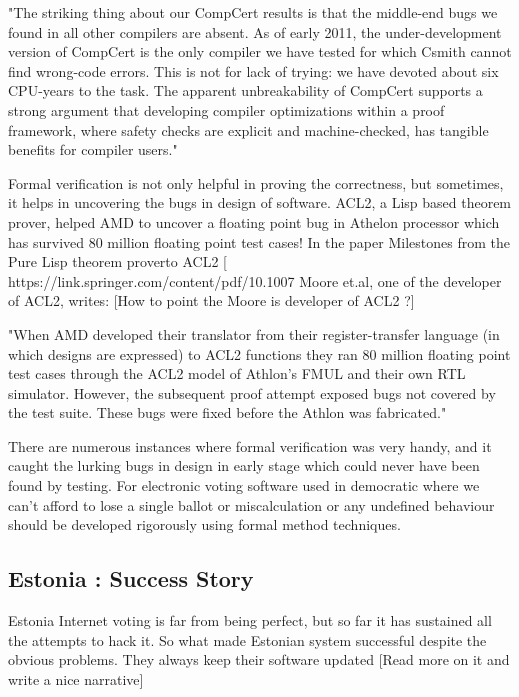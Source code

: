 	"The striking thing about our CompCert results is that the middle-end 
	bugs we found in all other compilers are absent. As of early 2011,
	the under-development version of CompCert is the only compiler we
	have tested for which Csmith cannot find wrong-code errors. This is
	not for lack of trying: we have devoted about six CPU-years to the
	task. The apparent unbreakability of CompCert supports a strong
	argument that developing compiler optimizations within a proof
	framework, where safety checks are explicit and machine-checked,
	has tangible benefits for compiler users."
	
	Formal verification is not only helpful in proving the correctness, 
	but sometimes, it helps in uncovering the bugs in design of
	software. ACL2, a Lisp based theorem prover, helped 
	AMD to uncover a floating point bug in Athelon processor which 
	has survived 80 million floating point test cases! 
	In the paper Milestones from the Pure Lisp theorem proverto ACL2 [
	https://link.springer.com/content/pdf/10.1007%
	Moore et.al, one of the developer of ACL2, writes:
	[How to point the Moore is developer of ACL2 ?]
	
	"When AMD developed their translator 
	from their register-transfer language (in which designs
	are expressed) to ACL2 functions they ran 80 million 
	floating point test cases through the ACL2 model of 
	Athlon’s FMUL and their own RTL simulator. However, the 
	subsequent proof attempt exposed bugs not covered by the
	test suite. These bugs were fixed before the Athlon was 
	fabricated."
	
	There are numerous instances where formal verification 
	was very handy, and it caught the lurking bugs in design in early 
	stage which could never have been found by testing. For 
	electronic voting software used in democratic where we 
	can't afford to lose a single ballot or miscalculation 
	or any undefined behaviour should be developed 
	rigorously using formal method techniques.   	
		
   
   \subsection{Estonia : Success Story}
	Estonia Internet voting is far from being perfect, but so far 
	it has sustained all the attempts to hack it. So what made 
	Estonian system successful despite the obvious problems. 
	They always keep their software updated [Read more on it and
	write a nice narrative]
	
